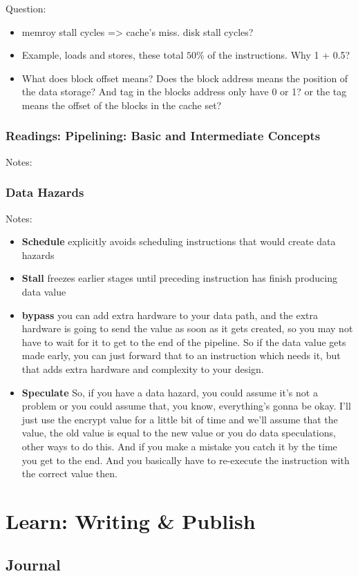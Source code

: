 \documentclass[UTF8]{article}
\begin{document}
Question:
\begin{itemize}
\item memroy stall cycles => cache's miss. disk stall cycles?
\item Example, loads and stores, these total $50\%$ of the instructions. Why 1 + 0.5?
\item What does block offset means? Does the block address means the position of the data storage? And tag in the blocks address only have 0 or 1? or the tag means the offset of the blocks in the cache set?
\end{itemize}
\subsubsection{Readings: Pipelining: Basic and Intermediate Concepts}
Notes:
\subsubsection{Data Hazards}
Notes:
\begin{itemize}
	\item \textbf{Schedule} explicitly avoids scheduling instructions that would create data hazards
	\item \textbf{Stall} freezes earlier stages until preceding instruction has finish producing data value
	\item \textbf{bypass} you can add extra hardware to your data path, and the extra hardware is going to send the value as soon as it gets created, so you may not have to wait for it to get to the end of the pipeline. So if the data value gets made early, you can just forward that to an instruction which needs it, but that adds extra hardware and complexity to your design. 
	\item \textbf{Speculate} So, if you have a data hazard, you could assume it's not a problem or you could assume that, you know, everything's gonna be okay. I'll just use the encrypt value for a little bit of time and we'll assume that the value, the old value is equal to the new value or you do data speculations, other ways to do this. And if you make a mistake you catch it by the time you get to the end. And you basically have to re-execute the instruction with the correct value then.  
\end{itemize}
\section{Learn: Writing \& Publish}
\subsection{Journal}
\end{document}
